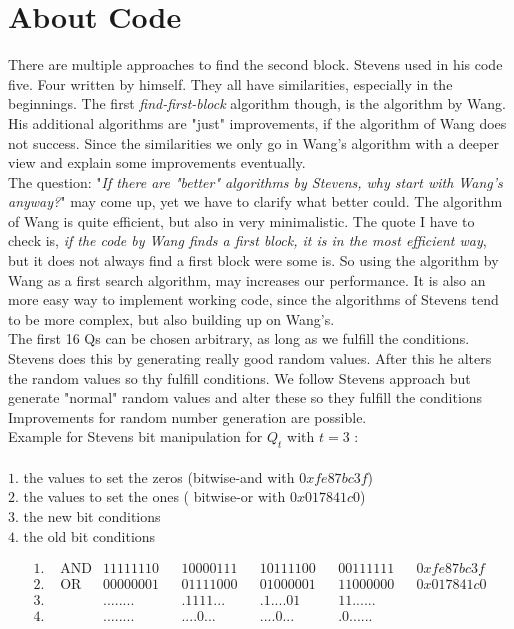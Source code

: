 \section{About Code}
There are multiple approaches to find the second block. Stevens used in his code five. Four written by himself.
They all have similarities, especially in the beginnings. 
The first \textit{find-first-block} algorithm though, is the algorithm by Wang. His additional algorithms are "just" improvements, if the algorithm of Wang does not success.
Since the similarities we only go in Wang's algorithm with a deeper view and explain some improvements eventually.\\
The question: "\textit{If there are "better" algorithms by Stevens, why start with Wang's anyway?}" may come up, yet we have to clarify what better could. The algorithm of Wang is quite efficient, but also in very minimalistic. 
The quote I have to check is, \textit{if the code by Wang finds a first block, it is in the most efficient way}, but it does not always find a first block were some is.
So using the algorithm by Wang as a first search algorithm, may increases our performance. It is also an more easy way to implement working code, since the algorithms of Stevens tend to be more complex, 
but also building up on Wang's.\\ 
The first 16 Qs can be chosen arbitrary, as long as we fulfill the conditions.
Stevens does this by generating really good random values.
After this he alters the random values so thy fulfill conditions.
We follow Stevens approach but generate "normal" random values and alter these so they fulfill the conditions
Improvements for random number generation are possible. \\
Example for Stevens bit manipulation for $Q_t$ with $t = 3$ :\\
\\
$1.$ the values to set the zeros (bitwise-and with $0xfe87bc3f$)\\
$2.$ the values to set the ones ( bitwise-or with $0x017841c0$)\\
$3.$ the new bit conditions\\
$4.$ the old bit conditions

\begin{align*}    
    1.& \text{ AND} & 11111110 & & 10000111 & & 10111100 & & 00111111 & & 0xfe87bc3f \\
    2.& \text{ OR}  & 00000001 & & 01111000 & & 01000001 & & 11000000 & & 0x017841c0 \\
    3.&             & ........ & & .1111... & & .1....01 & & 11...... & &  \\
    4.&             & ........ & & ....0... & & ....0... & & .0...... & &  
\end{align*}


